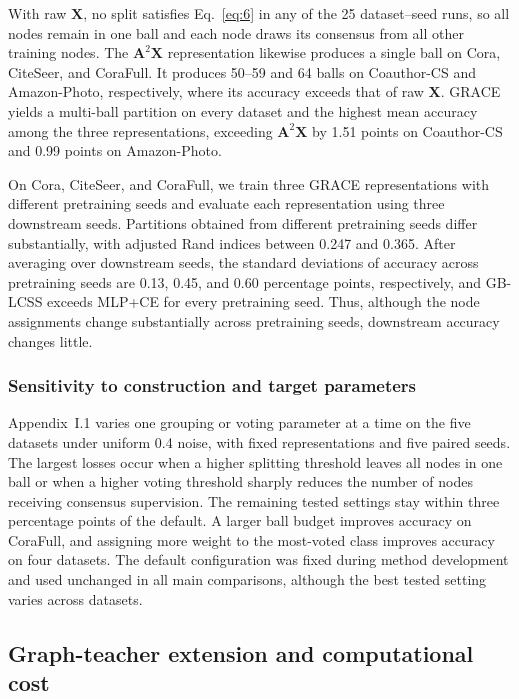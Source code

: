 \documentclass[10pt,letterpaper,nopreprintline]{elsarticle}
\theoremstyle{definition}
\theoremstyle{plain}
\begin{document}


With raw \(\mathbf{X}\), no split satisfies Eq.~\eqref{eq:6} in any of the 25 dataset--seed runs, so all nodes remain in one ball and each node draws its consensus from all other training nodes. The \(\mathbf{A}^2\mathbf{X}\) representation likewise produces a single ball on Cora, CiteSeer, and CoraFull. It produces 50--59 and 64 balls on Coauthor-CS and Amazon-Photo, respectively, where its accuracy exceeds that of raw \(\mathbf{X}\). GRACE yields a multi-ball partition on every dataset and the highest mean accuracy among the three representations, exceeding \(\mathbf{A}^2\mathbf{X}\) by 1.51 points on Coauthor-CS and 0.99 points on Amazon-Photo. 

On Cora, CiteSeer, and CoraFull, we train three GRACE representations with different pretraining seeds and evaluate each representation using three downstream seeds. Partitions obtained from different pretraining seeds differ substantially, with adjusted Rand indices \cite{ref74} between 0.247 and 0.365. After averaging over downstream seeds, the standard deviations of accuracy across pretraining seeds are 0.13, 0.45, and 0.60 percentage points, respectively, and GB-LCSS exceeds MLP+CE for every pretraining seed. Thus, although the node assignments change substantially across pretraining seeds, downstream accuracy changes little.

\subsubsection{Sensitivity to construction and target parameters}\label{sec:4.3.4}

Appendix~I.1 varies one grouping or voting parameter at a time on the five datasets under uniform 0.4 noise, with fixed representations and five paired seeds. The largest losses occur when a higher splitting threshold leaves all nodes in one ball or when a higher voting threshold sharply reduces the number of nodes receiving consensus supervision. The remaining tested settings stay within three percentage points of the default. A larger ball budget improves accuracy on CoraFull, and assigning more weight to the most-voted class improves accuracy on four datasets. The default configuration was fixed during method development and used unchanged in all main comparisons, although the best tested setting varies across datasets.

\subsection{Graph-teacher extension and computational cost}\label{sec:4.4}
\end{document}
